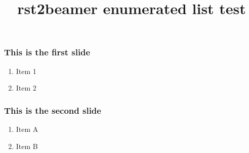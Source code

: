 \documentclass[t,english]{beamer}
\begin{document}
\title{rst2beamer enumerated list test%
  \label{rst2beamer-enumerated-list-test}}
\author{}
\date{}
\maketitle

\begin{frame}
\frametitle{This is the first slide}

\begin{enumerate}[<+-| alert@+>]

\item Item 1

\item Item 2
\end{enumerate}
\end{frame}

\begin{frame}
\frametitle{This is the second slide}

\begin{enumerate}[<+-| alert@+>]

\item Item A

\item Item B
\end{enumerate}
\end{frame}
\end{document}

